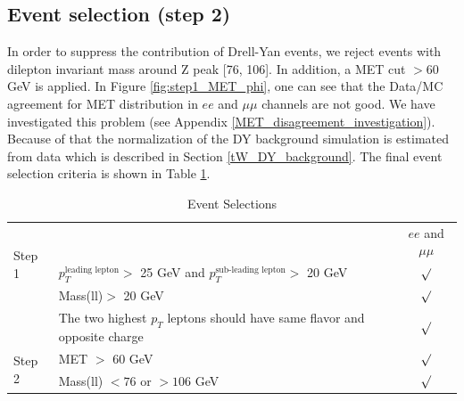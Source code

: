 \subsection{Event selection (step 2)}
\label{step2_selection}
In order to suppress the contribution of Drell-Yan events, we reject events with dilepton invariant mass around Z peak [76, 106]. In addition, a MET cut $>60$ GeV is applied. In Figure \ref{fig:step1_MET_phi}, one can see that the  Data/MC agreement for MET distribution in $ee$ and $\mu\mu$ channels are not good. We have investigated this problem (see Appendix \ref{MET_disagreement_investigation}). Because of that the normalization of the DY background simulation is estimated from data which is described in Section \ref{tW_DY_background}.
The final event selection criteria is shown in Table \ref{tab:Event-selection}.
\begin{table}[h]
\centering
\begin{tabular}{|l|l|c|}
\hline
\multirow{3}{*}{Step 1}         &                                                                                         & $ee$ and $\mu\mu$           \\ \cline{2-3}
                                & $p_{T}^{\text{leading lepton}}>$ 25 GeV and $p_{T}^{\text{sub-leading lepton}}>$ 20 GeV & $\surd$                     \\ \cline{2-3}
                                & Mass(ll)$>$ 20 GeV                                                                      & $\surd$                     \\ \cline{2-3}
                                & The two highest $p_{T}$ leptons should have same flavor and opposite charge             & $\surd$                     \\ \hline
\multirow{2}{*}{Step 2}         & MET $>$ 60 GeV                                                                          & $\surd$                     \\ \cline{2-3}
                                & Mass(ll) $<76$ or $>106$ GeV                                                            & $\surd$                     \\ \hline
\end{tabular}
\caption{Event Selections}
\label{tab:Event-selection}
\end{table}

